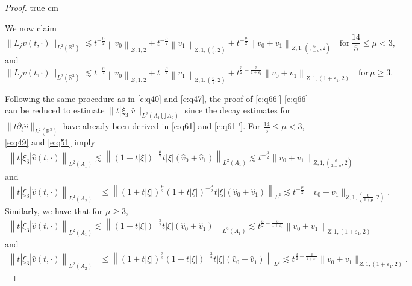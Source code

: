 \documentclass[11pt,twoside]{article}
\newcommand{\R}{\mathbb R}
\newcommand{\p}{\partial}
\newcommand{\f}{\frac}
\theoremstyle{plain}
\theoremstyle{definition}
\theoremstyle{remark}
\numberwithin{equation}{section}
\begin{document}
\begin{proof}
 true cm

We now claim
\begin{equation}\label{e:q66'}
\|L_jv(t, \cdot)\|_{L^2(\R^3)} \lesssim t^{-\f{\mu}{2}}\left\|v_0\right\|_{Z, 1, 2}+t^{-\f{\mu}{2}}\left\|v_1\right\|_{Z, 1,(\f65, 2)}+t^{-\f{\mu}{2}}\left\|v_0+v_1\right\|_{Z, 1,(\f{6}{3+\mu}, 2)}\quad \text{for}\, \f{14}{5}\leq\mu<3,
\end{equation}
and
\begin{equation}\label{e:q66}
\|L_jv(t, \cdot)\|_{L^2(\R^3)} \lesssim t^{-\f{\mu}{2}}\left\|v_0\right\|_{Z, 1, 2}+t^{-\f{\mu}{2}}\left\|v_1\right\|_{Z, 1,(\f65, 2)}+t^{\f32-\f{3}{1+\varepsilon_1}}\left\|v_0+v_1\right\|_{Z, 1,(1+\varepsilon_1, 2)}\quad \text{for}\, \mu\geq3.
\end{equation}

Following the same procedure as in \eqref{e:q40} and \eqref{e:q47}, the proof of \eqref{e:q66'}-\eqref{e:q66} can be reduced to estimate  $\|t|\xi_3|\hat{v}\|_{L^2(A_1\bigcup A_2)}$ since the decay estimates for $\|t\p_t\hat{v}\|_{L^2(\R^3)}$ have already been
derived in \eqref{e:q61} and \eqref{e:q61''}. For $\f{14}{5}\leq\mu<3$,
   \eqref{e:q49} and  \eqref{e:q51} imply
\begin{equation}\label{e:q67'}
\begin{aligned}
\left\|t|\xi_3|\hat{v}(t, \cdot)\right\|_{L^2(A_1)}\lesssim\left\|(1+t|\xi|)^{-\f{\mu}{2}}t|\xi|(\hat{v}_{0}+\hat{v}_{1})\right\|_{L^{2}(A_1)}
\lesssim t^{-\f{\mu}{2}}\left\|v_0+v_1\right\|_{Z, 1,(\f{6}{3+\mu}, 2)}
\end{aligned}
\end{equation}
and
\begin{equation}\label{e:q68'}
\begin{aligned}
\left\|t|\xi_3|\hat{v}(t, \cdot)\right\|_{L^2(A_2)} & \leq\left\|(1+t|\xi|)^{\f{\mu}{2}}(1+t|\xi|)^{-\f{\mu}{2}}t|\xi|(\hat{v}_{0}+\hat{v}_{1})\right\|_{L^{2}} \lesssim t^{-\f{\mu}{2}}\|v_0+v_1\|_{Z, 1, (\f{6}{3+\mu}, 2)}.
\end{aligned}
\end{equation}
Similarly, we have that for $\mu\geq3$,
\begin{equation}\label{e:q67}
\begin{aligned}
\left\|t|\xi_3|\hat{v}(t, \cdot)\right\|_{L^2(A_1)}  \lesssim\left\|(1+t|\xi|)^{-\f32}t|\xi|(\hat{v}_{0}+\hat{v}_{1})\right\|_{L^{2}(A_1)}
\lesssim t^{\f32-\f{3}{1+\varepsilon_1}}\left\|v_0+v_1\right\|_{Z, 1,(1+\varepsilon_1, 2)}
\end{aligned}
\end{equation}
and
\begin{equation}\label{e:q68}
\begin{aligned}
\left\|t|\xi_3|\hat{v}(t, \cdot)\right\|_{L^2(A_2)} & \leq\left\|(1+t|\xi|)^{\f32}(1+t|\xi|)^{-\f32}t|\xi|(\hat{v}_{0}+\hat{v}_{1})\right\|_{L^{2}} \lesssim t^{\f32-\f{3}{1+\varepsilon_1}}\|v_0+v_1\|_{Z, 1, (1+\varepsilon_1, 2)}.
\end{aligned}
\end{equation}


\end{proof}
\end{document}
